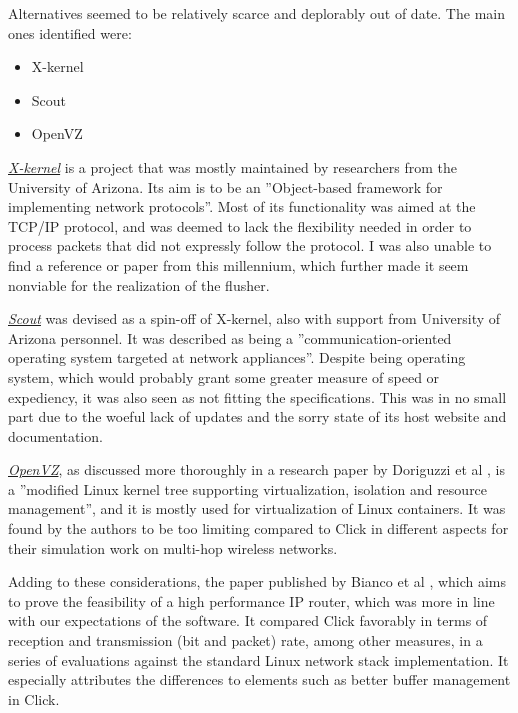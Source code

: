 Alternatives seemed to be relatively scarce and deplorably out of date. The main ones identified were:
\begin{itemize}
\item X-kernel
\item Scout
\item OpenVZ
\end{itemize}

\href{http://www.cs.arizona.edu/projects/xkernel/}{\textit{X-kernel}} is a project that was mostly maintained by researchers from the University of Arizona. Its aim is to be an ''Object-based framework for implementing network protocols''. Most of its functionality was aimed at the TCP/IP protocol, and was deemed to lack the flexibility needed in order to process packets that did not expressly follow the protocol. I was also unable to find a reference or paper from this millennium, which further made it seem nonviable for the realization of the flusher.

\href{http://www.cs.arizona.edu/projects/scout/}{\textit{Scout}} was devised as a spin-off of X-kernel, also with support from University of Arizona personnel. It was described as being  a ''communication-oriented operating system targeted at network appliances''. Despite being operating system, which would probably grant some greater measure of speed or expediency, it was also seen as not fitting the specifications. This was in no small part due to the woeful lack of updates and the sorry state of its host website and documentation.

\href{https://openvz.org/}{\textit{OpenVZ}}, as discussed more thoroughly in a research paper by Doriguzzi et al \cite{DoriguzziCorin2011}, is a ''modified Linux kernel tree supporting virtualization, isolation and resource management'', and it is mostly used for virtualization of Linux containers. It was found by the authors to be too limiting compared to Click in different aspects for their simulation work on multi-hop wireless networks.

Adding to these considerations, the paper published by Bianco et al \cite{Bianco2005}, which aims to prove the feasibility of a high performance IP router, which was more in line with our expectations of the software. It compared Click favorably in terms of reception and transmission (bit and packet) rate, among other measures, in a series of evaluations against the standard Linux network stack implementation. It especially attributes the differences to elements such as better buffer management in Click.

